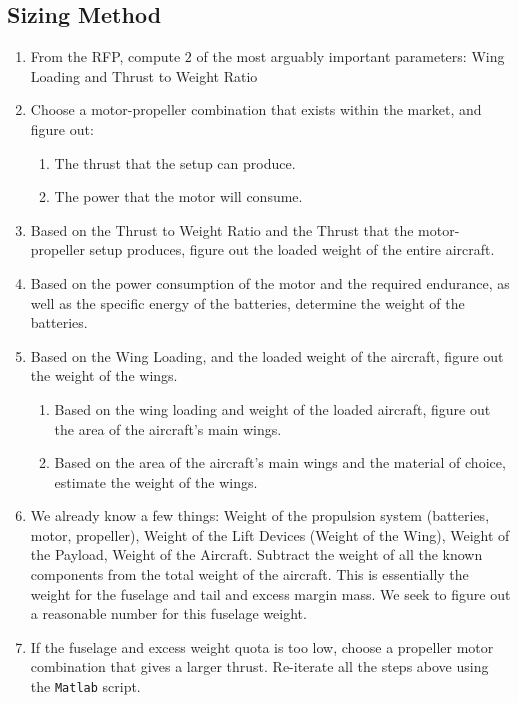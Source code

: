 \documentclass[letter, 12pt]{article}
\begin{document}
\begin{center}
\section{Sizing Method}
\begin{comment}
\end{comment}
\begin{enumerate}
\item From the RFP, compute $2$ of the most arguably important parameters: Wing Loading and Thrust to Weight Ratio
\item Choose a motor-propeller combination that exists within the market, and figure out:
    \begin{enumerate}
    \item The thrust that the setup can produce.
    \item The power that the motor will consume.
    \end{enumerate}
\item Based on the Thrust to Weight Ratio and the Thrust that the motor-propeller setup produces, figure out the loaded weight of the entire aircraft.
\item Based on the power consumption of the motor and the required endurance, as well as the specific energy of the batteries, determine the weight of the batteries.
\item Based on the Wing Loading, and the loaded weight of the aircraft, figure out the weight of the wings.
    \begin{enumerate}
    \item Based on the wing loading and weight of the loaded aircraft, figure out the area of the aircraft's main wings.
    \item Based on the area of the aircraft's main wings and the material of choice, estimate the weight of the wings.
    \end{enumerate}
\item We already know a few things: Weight of the propulsion system (batteries, motor, propeller), Weight of the Lift Devices (Weight of the Wing), Weight of the Payload, Weight of the Aircraft. Subtract the weight of all the known components from the total weight of the aircraft. This is essentially the weight for the fuselage and tail and excess margin mass. We seek to figure out a reasonable number for this fuselage weight.
\item If the fuselage and excess weight quota is too low, choose a propeller motor combination that gives a larger thrust. Re-iterate all the steps above using the \texttt{Matlab} script.
\end{enumerate}


\end{center}
\end{document}
